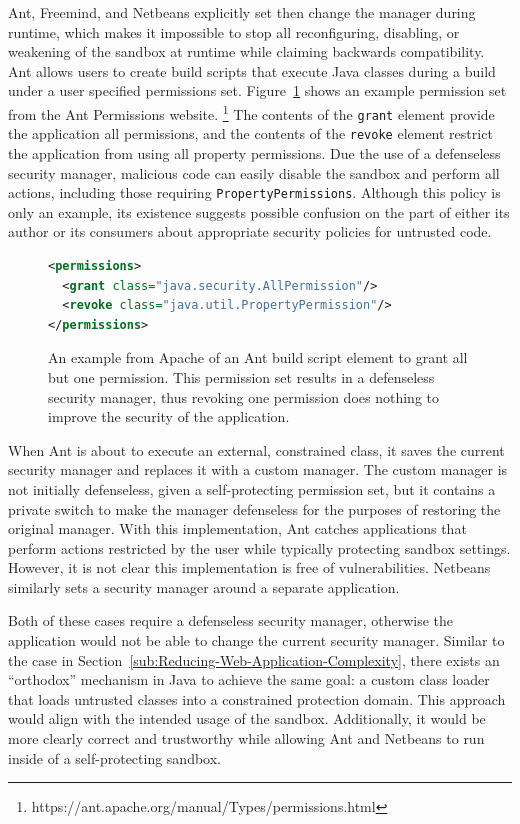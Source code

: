 \documentclass{sig-alternate}
\begin{document}
Ant, Freemind, and Netbeans explicitly set then change the manager
during runtime, which makes it impossible to stop all reconfiguring, disabling,
or weakening of the sandbox at runtime while claiming backwards
compatibility. Ant allows users to create build scripts that 
execute Java classes during a build under a user specified
permissions set. Figure~\ref{fig:Ant Permissions Example}
shows an example permission set from the Ant Permissions website.%
\footnote{https://ant.apache.org/manual/Types/permissions.html%
} The contents of the \texttt{grant} element provide the application
all permissions, and the contents of the \texttt{revoke} element restrict
the application from using all property permissions. Due the use of a
defenseless security manager, malicious code can easily disable the sandbox and perform all actions,
including those requiring \texttt{PropertyPermissions}.  Although this policy is
only an example, its existence suggests possible confusion on the part of either its author
or its consumers about appropriate security policies for untrusted code.

\begin{figure}
\begin{lstlisting}[language=XML,basicstyle={\scriptsize}]
<permissions>   
  <grant class="java.security.AllPermission"/>   
  <revoke class="java.util.PropertyPermission"/> 
</permissions>
\end{lstlisting}

\caption{An example from Apache of an Ant build script element to grant all but one permission. This permission set results in a defenseless security manager, thus revoking one permission does nothing to improve the security of the application.}
\label{fig:Ant Permissions Example}
\end{figure}

When Ant is about to execute an external, constrained class, it saves the
current security manager and replaces it with a custom manager. The custom
manager is not initially defenseless, given a self-protecting permission set, but
it contains a private switch to make the manager defenseless for the purposes of
restoring the original manager. With this implementation, Ant catches
applications that perform actions restricted by the user while typically
protecting sandbox settings. However, it is not clear this implementation is
free of vulnerabilities. Netbeans similarly sets a security manager around a
separate application.

Both of these cases require a defenseless security manager, otherwise
the application would not be able to change the current security manager. 
Similar to the case in Section~\ref{sub:Reducing-Web-Application-Complexity},
there exists an ``orthodox'' mechanism in Java to achieve the same goal: a custom class
loader that loads untrusted classes into a constrained protection
domain.  This approach would align with the intended usage of the sandbox.
Additionally, it would be more clearly correct and trustworthy while
allowing Ant and Netbeans to run inside of a self-protecting sandbox.
\end{document}
